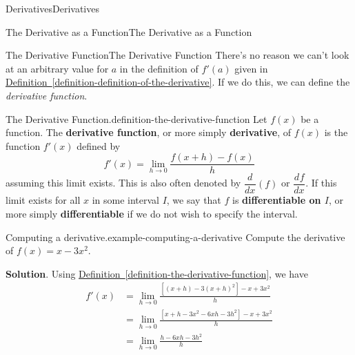 \documentclass[10pt,]{book}
\newcommand{\terminology}[1]{\textbf{#1}}
\numberwithin{equation}{section}
\newcommand{\dv}[3][]{\dfrac{d^{#1} #2}{d #3^{#1}}}
\begin{document}
\begin{chapterptx}{Derivatives}{}{Derivatives}{}{}
%
%
\typeout{************************************************}
\typeout{************************************************}
%
\begin{sectionptx}{The Derivative as a Function}{}{The Derivative as a Function}{}{}\label{section-the-derivative-as-a-function}
%
%
\typeout{************************************************}
\typeout{************************************************}
%
\begin{subsectionptx}{The Derivative Function}{}{The Derivative Function}{}{}\label{subsection-the-derivative-function}
\hypertarget{p-100}{}%
There's no reason we can't look at an arbitrary value for \(a\) in the definition of \(f'(a)\) given in \hyperref[definition-definition-of-the-derivative]{Definition~\ref{definition-definition-of-the-derivative}}. If we do this, we can define the \emph{derivative function}.%
\begin{definition}{The Derivative Function.}{definition-the-derivative-function}%
\hypertarget{p-101}{}%
Let \(f(x)\) be a function. The \terminology{derivative function}, or more simply \terminology{derivative}, of \(f(x)\) is the function \(f'(x)\) defined by%
\begin{equation*}
f'(x) = \lim_{h\to0}\frac{f(x+h) - f(x)}{h}
\end{equation*}
assuming this limit exists. This is also often denoted by \(\dv{}{x}(f)\) or \(\dv{f}{x}\). If this limit exists for all \(x\) in some interval \(I\), we say that \(f\) is \terminology{differentiable on \(I\)}, or more simply \terminology{differentiable} if we do not wish to specify the interval.%
\end{definition}
\begin{example}{Computing a derivative.}{example-computing-a-derivative}%
\hypertarget{p-102}{}%
Compute the derivative of \(f(x) = x - 3x^{2}\).%
\par\smallskip%
\noindent\textbf{Solution}.\hypertarget{solution-22}{}\quad%
\hypertarget{p-103}{}%
Using \hyperref[definition-the-derivative-function]{Definition~\ref{definition-the-derivative-function}}, we have%
\begin{align*}
f'(x) & = \lim_{h\to0}\frac{[(x+h)-3(x+h)^{2}] - x + 3x^{2}}{h} \\
& = \lim_{h\to0}\frac{[x+h-3x^{2}-6xh-3h^{2}] - x + 3x^{2}}{h} \\
& = \lim_{h\to0}\frac{h-6xh-3h^{2}}{h} \\

\end{align*}
\end{example}
\end{subsectionptx}
\end{sectionptx}
\end{chapterptx}
\end{document}
